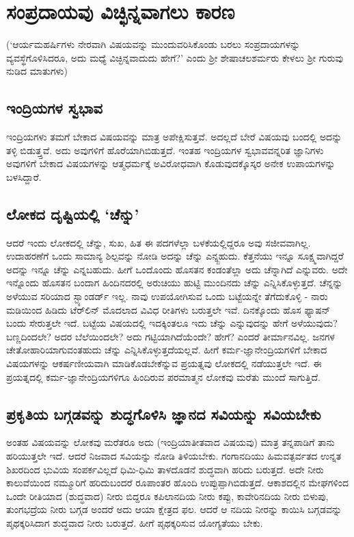 \chapter*{ಸಂಪ್ರದಾಯವು ವಿಚ್ಛಿನ್ನವಾಗಲು ಕಾರಣ}

(`ಆರ್ಯಮಹರ್ಷಿಗಳು ನೇರವಾಗಿ ವಿಷಯವನ್ನು ಮುಂದುವರಿಸಿಕೊಂಡು ಬರಲು ಸಂಪ್ರದಾಯಗಳನ್ನು ವ್ಯವಸ್ಥೆಗೊಳಿಸಿದರೂ, ಅದು ಮಧ್ಯೆ  ವಿಚ್ಛಿನ್ನವಾದುದು ಹೇಗೆ?' ಎಂದು ಶ್ರೀ ಶೇಷಾಚಲಶರ್ಮರು ಕೇಳಲು ಶ್ರೀ ಗುರುವು ನುಡಿದ ಮಾತುಗಳು)

\section*{ಇಂದ್ರಿಯಗಳ ಸ್ವಭಾವ}

ಇಂದ್ರಿಯಗಳು ತಮಗೆ ಬೇಕಾದ ವಿಷಯವನ್ನು ಮಾತ್ರ ಅಪೇಕ್ಷಿಸುತ್ತವೆ. ಅದಲ್ಲದೆ ಬೇರೆ ವಿಷಯವು ಬಂದಲ್ಲಿ ಅದನ್ನು ತಳ್ಳಿ ಬಿಡುತ್ತ್ತವೆ. ಅದು ಅವುಗಳಿಗೆ ಹೊರೆಯಾಗಿಬಿಡುತ್ತದೆ. ಇಂತಹ ಇಂದ್ರಿಯಗಳ ಸ್ವಭಾವವನ್ನರಿತ ಜ್ಞಾನಿಗಳು ಅವುಗಳಿಗೆ ಬೇಕಾದ ವಿಷಯಗಳನ್ನು ಆತ್ಮಧರ್ಮಕ್ಕೆ ಅವಿರೋಧವಾಗಿ ಕೊಡುವುದಕ್ಕೊಸ್ಕರ ಅನೇಕ ಉಪಾಯಗಳನ್ನು ಬಳಸಿದ್ದಾರೆ.

\section*{ಲೋಕದ ದೃಷ್ಟಿಯಲ್ಲಿ `ಚೆನ್ನು'}

ಆದರೆ ಇಂದು ಲೋಕದಲ್ಲಿ ಚೆನ್ನು, ಸುಖ, ಹಿತ ಈ ಪದಗಳೆಲ್ಲಾ ಬಳಕೆಯಲ್ಲಿದ್ದರೂ ಅವು ಸಜೀವವಾಗಿಲ್ಲ. ಉದಾಹರಣೆಗೆ ಒಂದು ಸಾಮಾನ್ಯ ಶಿಲ್ಪವನ್ನು ನೋಡಿ ಅದನ್ನು ಚೆನ್ನು ಎನ್ನ್ಬಹುದು. ಕೆತ್ತನೆಯು ಇನ್ನೂ ಸೂಕ್ಷ್ಮವಾಗಿದ್ದರೆ ಅದನ್ನು ಇನ್ನೂ ಚೆನ್ನು ಎನ್ನಬಹುದು. ಹೀಗೆ ಒಂದೊಂದು ಹೊಸತನ ಕಂಡಂತೆಲ್ಲಾ ಅದು ಚೆನ್ನಾಗಿದೆ ಎನ್ನುವರು. ಅದೇ ಇನ್ನೊಂದು ಹೊಸತನ ಬಂದಾಗ ಹಿಂದಿನದರಲ್ಲಿ ಅರುಚಿಯು ಹುಟ್ಟಿ  ಮುಂದಿನದು ಚೆನ್ನು ಎನ್ನಿಸಿಕೊಳ್ಳುತ್ತದೆ. ಚೆನ್ನನ್ನು ಅಳೆಯುವ ಸರಿಯಾದ ಸ್ಟ್ಯಾಂಡರ್ಡ್ ಇಲ್ಲ. ನಾವು ಉಪಯೋಗಿಸುವ ಒಂದು ಬಟ್ಟೆಯನ್ನೇ  ತೆಗೆದುಕೊಳ್ಳಿ - ನಾರು ಮಡಿಯಿಂದ ಹಿಡಿದು ಟೆರ್‌ಲಿನ್ ಮೊದಲಾದ ವಿವಿಧ ರೀತಿಗಳು ಬರುತ್ತಲೇ ಇವೆ. ದಿನಕ್ಕೊಂದು ಹೊಸ ಫ್ಯಾಷನ್ ಬಂದು ಸೇರುತ್ತಲೇ ಇದೆ. ಬಟ್ಟೆಯ ವಿಷಯದಲ್ಲಿ ಇದಕ್ಕಿಂತಲೂ ಇದು ಚೆನ್ನು ಎನ್ನುವುದನ್ನು ಹೇಗೆ ಅಳೆಯುವುದು? ಬಣ್ಣದಿಂದಲೇ? ಅದರ ಬೆಲೆಯಿಂದಲೇ? ಅದು ಗಟ್ಟಿಯಾಗಿದೆಯೆಂದೇ? ಹೇಗೆ? ಎಂದರೆ ತೀರ್ಮಾನವಿಲ್ಲ. ಜನಗಳ ಚೇತೋಹಾರಿಯಾಗುವಂತಹುದು ಚೆನ್ನು ಎನ್ನಿಸಿಕೊಳ್ಳುತ್ತದೆಯಲ್ಲವೆ. ಹೀಗೆ ಕರ್ಮ-ಜ್ಞಾನೇಂದ್ರಿಯಗಳಿಗೆ ಬೇಕಾದ ವಿಷಯಗಳನ್ನು ಆಕರ್ಷಣೀಯವಾಗಿ ಮಾಡಿಕೊಡಬೇಕೆನ್ನುವ ಪ್ರಯತ್ನವು ಲೋಕದಲ್ಲಿ ನಡೆಯುತ್ತಲೇ ಇದೆ. ಈ ಪ್ರಯತ್ನದಲ್ಲಿ ಕರ್ಮ-ಜ್ಞಾನೇಂದ್ರಿಯಗಳಿಗೂ ಹಿಂದಿರುವ ಪರಮಾತ್ಮನ ಲೋಕವು ಮರೆತು ಮುಂದೆ ಸಾಗುತ್ತಿದೆ.

\section*{ಪ್ರಕೃತಿಯ ಬಗ್ಗಡವನ್ನು ಶುದ್ಧಗೊಳಿಸಿ ಜ್ಞಾನದ ಸವಿಯನ್ನು ಸವಿಯಬೇಕು}

ಅಂತಹ ವಿಷಯವನ್ನು ಲೋಕವು ಮರೆತರೂ ಅದು (ಇಂದ್ರಿಯಾತೀತವಾದ ವಿಷಯವು) ಮಾತ್ರ ತನ್ನಪಾಡಿಗೆ ತಾನು ಹರಿಯುತ್ತಲೇ ಇದೆ. ಆದರೆ ನಿಜವಾದ ಸವಿಯನ್ನು ನೋಡಿ ತಿಳಿಯಬೇಕು. ಗಂಗಾನದಿಯು ಹಿಮವತ್ಪರ್ವತದ ಉನ್ನತ ಶಿಖರದಿಂದ ಭುವಿಯ ಸಂಪರ್ಕವಿಲ್ಲದೆ ಧಿಮಿ-ಧಿಮಿ ತಾಳದೊಡನೆ ಶುದ್ಧವಾಗಿ ಹರಿದು ಬರುತ್ತದೆ. ಅದೇ ನೀರು ಕಾಲುವೆಯಿಂದ ನಮ್ಮೂರಿಗೆ ಹರಿದುಬಂದರೆ ರೂಪಾಂತರ ಹೊಂದಿ ಉಪ್ಪುಪ್ಪಾಗಿಬಿಡುತ್ತದೆ. ಆಕಾಶದಲ್ಲಿನ ಮೇಘಗಳಿಂದ ಒಂದೇ ರೀತಿಯಾದ (ಶುದ್ಧವಾದ) ನೀರು ಬಿದ್ದರೂ ಕಪಿಲಾನದಿಯ ನೀರು ಕಪ್ಪು, ಕಾವೇರಿನದಿಯ ನೀರು ಬಿಳುಪು, ತುಂಗಭದ್ರೆಯ ನೀರು ಬಗ್ಗಡ ಅಂದರೆ ಅದು ಆಯಾ ಕ್ಷೇತ್ರದ ಫಲ. ಆದರೆ ಆ ನದಿಯ ನೀರನ್ನು ಕಾಯಿಸಿ ಬಗ್ಗಡವನ್ನು ಪೃಥಕ್ಕರಿಸಿದಾಗ ಶುದ್ಧವಾದ ನೀರು ಬರುತ್ತದೆ. ಹೀಗೆ ಪೃಥಕ್ಕರಿಸುವ ಯೋಗ್ಯತೆಯು ಬೇಕು.

